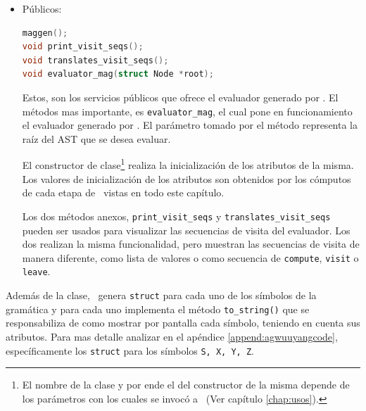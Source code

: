 \begin{description}
\begin{itemize}
El método \texttt{traverse} recorre el AST de entrada al evaluador y asigna a cada nodo un plan de evaluación\footnote{Los planes que asigna el método traverse son los generados estáticamente por \maggen.} y con ello una secuencia de visita correspondiente.

\texttt{add\_plan} y \texttt{add\_plan\_project} agregan planes y planes proyectados respectivamente, los mismos son usados en la inicialización del evaluador (constructor de clase).

\item Públicos:

\vspace{0.3cm}
\begin{lstlisting}[basicstyle=\scriptsize, backgroundcolor=\color{white}, language=c++, columns=fullflexible, linewidth=6cm]
maggen();
void print_visit_seqs();
void translates_visit_seqs();
void evaluator_mag(struct Node *root);
\end{lstlisting}
\vspace{0.3cm}

Estos, son los servicios públicos que ofrece el evaluador generado por \maggen. El métodos mas importante, es \texttt{evaluator\_mag}, el cual pone en funcionamiento el evaluador generado por \maggen. El parámetro tomado por el método representa la raíz del AST que se desea evaluar.

El constructor de clase\footnote{El nombre de la clase y por ende el del constructor de la misma depende de los parámetros con los cuales se invocó a \maggen\ (Ver capítulo \ref{chap:usos}).} realiza la inicialización de los atributos de la misma. Los valores de inicialización de los atributos son obtenidos por los cómputos de cada etapa de \maggen\ vistas en todo este capítulo.

Los dos métodos anexos, \texttt{print\_visit\_seqs} y \texttt{translates\_visit\_seqs} pueden ser usados para visualizar las secuencias de visita del evaluador. Los dos realizan la misma funcionalidad, pero muestran las secuencias de visita de manera diferente, como lista de valores o como secuencia de \texttt{compute}, \texttt{visit} o \texttt{leave}.
\end{itemize}
\end{description}

Además de la clase, \maggen\ genera \texttt{struct} para cada uno de los símbolos de la gramática y para cada uno implementa el método \texttt{to\_string()} que se responsabiliza de como mostrar por pantalla cada símbolo, teniendo en cuenta sus atributos. Para mas detalle analizar en el apéndice \ref{append:agwuuyangcode}, específicamente los \texttt{struct} para los símbolos \texttt{S, X, Y, Z}.

